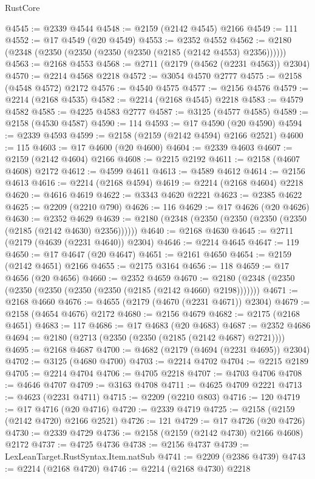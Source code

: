 \begin{lexlean}{RustCore}
\begin{coremodule}
@4545 := @2339 @4544
@4548 := @2159 (@2142 @4545) @2166
@4549 := 111
@4552 := @17 @4549 (@20 @4549)
@4553 := @2352 @4552
@4562 := @2180 (@2348 (@2350 (@2350 (@2350 (@2350 (@2185 (@2142 @4553) @2356))))))
@4563 := @2168 @4553
@4568 := @2711 (@2179 (@4562 (@2231 @4563)) @2304)
@4570 := @2214 @4568 @2218
@4572 := @3054 @4570 @2777
@4575 := @2158 (@4548 @4572) @2172
@4576 := @4540 @4575
@4577 := @2156 @4576
@4579 := @2214 (@2168 @4535)
@4582 := @2214 (@2168 @4545) @2218
@4583 := @4579 @4582
@4585 := @4225 @4583 @2777
@4587 := @3125 (@4577 @4585)
@4589 := @2158 (@4530 @4587)
@4590 := 114
@4593 := @17 @4590 (@20 @4590)
@4594 := @2339 @4593
@4599 := @2158 (@2159 (@2142 @4594) @2166 @2521)
@4600 := 115
@4603 := @17 @4600 (@20 @4600)
@4604 := @2339 @4603
@4607 := @2159 (@2142 @4604) @2166
@4608 := @2215 @2192
@4611 := @2158 (@4607 @4608) @2172
@4612 := @4599 @4611
@4613 := @4589 @4612
@4614 := @2156 @4613
@4616 := @2214 (@2168 @4594)
@4619 := @2214 (@2168 @4604) @2218
@4620 := @4616 @4619
@4622 := @3343 @4620 @2221
@4623 := @2385 @4622
@4625 := @2209 (@2210 @790)
@4626 := 116
@4629 := @17 @4626 (@20 @4626)
@4630 := @2352 @4629
@4639 := @2180 (@2348 (@2350 (@2350 (@2350 (@2350 (@2185 (@2142 @4630) @2356))))))
@4640 := @2168 @4630
@4645 := @2711 (@2179 (@4639 (@2231 @4640)) @2304)
@4646 := @2214 @4645
@4647 := 119
@4650 := @17 @4647 (@20 @4647)
@4651 := @2161 @4650
@4654 := @2159 (@2142 @4651) @2166
@4655 := @2175 @3164
@4656 := 118
@4659 := @17 @4656 (@20 @4656)
@4660 := @2352 @4659
@4670 := @2180 (@2348 (@2350 (@2350 (@2350 (@2350 (@2350 (@2185 (@2142 @4660) @2198)))))))
@4671 := @2168 @4660
@4676 := @4655 (@2179 (@4670 (@2231 @4671)) @2304)
@4679 := @2158 (@4654 @4676) @2172
@4680 := @2156 @4679
@4682 := @2175 (@2168 @4651)
@4683 := 117
@4686 := @17 @4683 (@20 @4683)
@4687 := @2352 @4686
@4694 := @2180 (@2713 (@2350 (@2350 (@2185 (@2142 @4687) @2721))))
@4695 := @2168 @4687
@4700 := @4682 (@2179 (@4694 (@2231 @4695)) @2304)
@4702 := @3125 (@4680 @4700)
@4703 := @2214 @4702
@4704 := @2215 @2189
@4705 := @2214 @4704
@4706 := @4705 @2218
@4707 := @4703 @4706
@4708 := @4646 @4707
@4709 := @3163 @4708
@4711 := @4625 @4709 @2221
@4713 := @4623 (@2231 @4711)
@4715 := @2209 (@2210 @803)
@4716 := 120
@4719 := @17 @4716 (@20 @4716)
@4720 := @2339 @4719
@4725 := @2158 (@2159 (@2142 @4720) @2166 @2521)
@4726 := 121
@4729 := @17 @4726 (@20 @4726)
@4730 := @2339 @4729
@4736 := @2158 (@2159 (@2142 @4730) @2166 @4608) @2172
@4737 := @4725 @4736
@4738 := @2156 @4737
@4739 := LexLeanTarget.RustSyntax.Item.natSub
@4741 := @2209 (@2386 @4739)
@4743 := @2214 (@2168 @4720)
@4746 := @2214 (@2168 @4730) @2218

\end{coremodule}
\end{lexlean}
